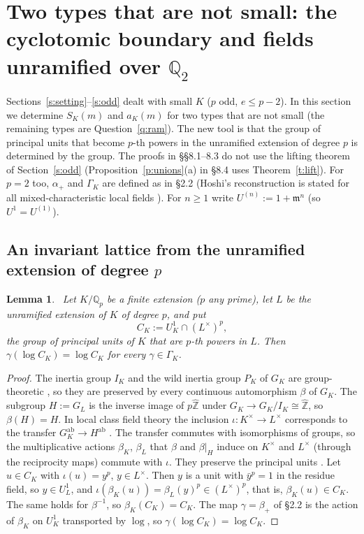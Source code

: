 \documentclass[11pt,a4paper]{article}
\newcommand{\Z}{\mathbb{Z}}
\newcommand{\Qp}{\mathbb{Q}_p}
\newcommand{\fm}{\mathfrak{m}}
\newcommand{\lab}[2]{{\upshape\fcolorbox{#1}{#1!8}{\scriptsize\sffamily\bfseries\textcolor{#1}{#2}}}}
\newcommand{\tagP}{\lab{ForestGreen}{P}}
\theoremstyle{plain}
\newtheorem{lemma}[theorem]{Lemma}
\theoremstyle{definition}
\theoremstyle{remark}
\begin{document}
\section{Two types that are not small: the cyclotomic boundary and fields unramified over \texorpdfstring{$\mathbb Q_2$}{Q2}}\label{s:other}

Sections~\ref{s:setting}--\ref{s:odd} dealt with small $K$ ($p$ odd, $e\le p-2$). In this section we determine
$S_K(m)$ and $a_K(m)$ for two types that are not small (the remaining types are Question~\ref{q:ram}). The new tool is
that the group of principal units that become $p$-th powers in the unramified extension of degree $p$ is determined
by the group. The proofs in \S\S8.1--8.3 do not use the lifting theorem of Section~\ref{s:odd} (Proposition~\ref{p:unions}(a)
in \S8.4 uses Theorem~\ref{t:lift}). For $p=2$ too, $\alpha_+$ and $\Gamma_K$ are defined as in \S2.2 (Hoshi's
reconstruction is stated for all mixed-characteristic local fields \cite[\S3]{Hoshi}). For $n\ge1$ write
$U^{(n)}:=1+\fm^n$ (so $U^1=U^{(1)}$).

\subsection{An invariant lattice from the unramified extension of degree \texorpdfstring{$p$}{p}}

\begin{lemma}\label{l:CK}
\tagP\ Let $K/\Qp$ be a finite extension ($p$ any prime), let $L$ be the unramified extension of $K$ of degree $p$, and
put
\[
C_K:=U^1_K\cap(L^{\times})^p,
\]
the group of principal units of $K$ that are $p$-th powers in $L$. Then $\gamma(\log C_K)=\log C_K$ for every
$\gamma\in\Gamma_K$.
\end{lemma}
\begin{proof}
The inertia group $I_K$ and the wild inertia group $P_K$ of $G_K$ are group-theoretic \cite[Def.~3.5(iii),
Prop.~3.6]{Hoshi}, so they are preserved by every continuous automorphism $\beta$ of $G_K$. The subgroup $H:=G_L$ is the
inverse image of $p\widehat{\Z}$ under $G_K\to G_K/I_K\cong\widehat{\Z}$, so $\beta(H)=H$. In local class field
theory the inclusion $\iota\colon K^{\times}\to L^{\times}$ corresponds to the transfer $G_K^{\mathrm{ab}}\to
H^{\mathrm{ab}}$ \cite[Lemma~1.7(3)]{Hoshi}. The transfer commutes with isomorphisms of groups, so the multiplicative
actions $\beta_K$, $\beta_L$ that $\beta$ and $\beta|_H$ induce on $K^{\times}$ and $L^{\times}$ (through the
reciprocity maps) commute with $\iota$. They preserve the principal units \cite[Prop.~3.11(i)]{Hoshi}. Let $u\in C_K$
with $\iota(u)=y^p$, $y\in L^{\times}$. Then $y$ is a unit with $\bar y^p=1$ in the residue field, so $y\in U^1_L$, and
$\iota(\beta_K(u))=\beta_L(y)^p\in(L^{\times})^p$, that is, $\beta_K(u)\in C_K$. The same holds for $\beta^{-1}$, so
$\beta_K(C_K)=C_K$. The map $\gamma=\beta_+$ of \S2.2 is the action of $\beta_K$ on $U^1_K$ transported by $\log$, so
$\gamma(\log C_K)=\log C_K$.
\end{proof}
\end{document}
